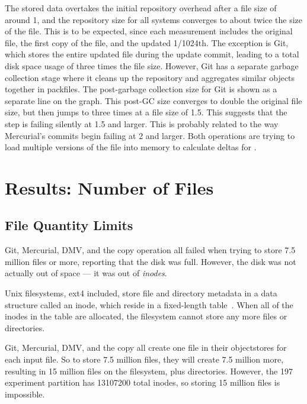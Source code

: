 The stored data overtakes the initial \gls{repository} overhead after a file
size of around \SI{1}{\mib}, and the \gls{repository} size for all systems
converges to about twice the size of the file. This is to be expected, since
each measurement includes the original file, the first copy of the file, and the
updated \num{1/1024}th. The exception is Git, which stores the entire updated
file during the update \gls{commit}, leading to a total disk space usage of
three times the file size. However, Git has a separate garbage collection stage
where it cleans up the \gls{repository} and aggregates similar objects together
in \glspl{packfile}. The post-garbage collection size for Git is shown as a
separate line on the graph. This post-GC size converges to double the original
file size, but then jumps to three times at a file size of \SI{1.5}{\gib}. This
suggests that the  step is failing silently at
\SI{1.5}{\gib} and larger. This is probably related to the way Mercurial's
\glspl{commit} begin failing at \SI{2}{\gib} and larger. Both operations are
trying to load multiple versions of the file into memory to calculate deltas for
.

%


\cleardoublepage

\section{Results: Number of Files}
\label{results-num-files}

\subsection{File Quantity Limits}

Git, Mercurial, DMV, and the copy operation all failed when trying to store
\num{7.5} million files or more, reporting that the disk was full. However, the
disk was not actually out of space --- it was out of \emph{\glspl{inode}}.


Unix filesystems, ext4 included, store file and directory metadata in a data
structure called an \gls{inode}, which reside in a fixed-length
table~\cite{unix_timesharing_system}. When all of the \glspl{inode} in the table
are allocated, the filesystem cannot store any more files or directories.

Git, Mercurial, DMV, and the copy all create one file in their
\glspl{objectstore} for each input file. So to store \num{7.5} million files,
they will create \num{7.5} million more, resulting in \num{15} million files on
the filesystem, plus directories. However, the \SI{197}{\gib} experiment
partition has \num{13107200} total \glspl{inode}, so storing \num{15} million
files is impossible.

